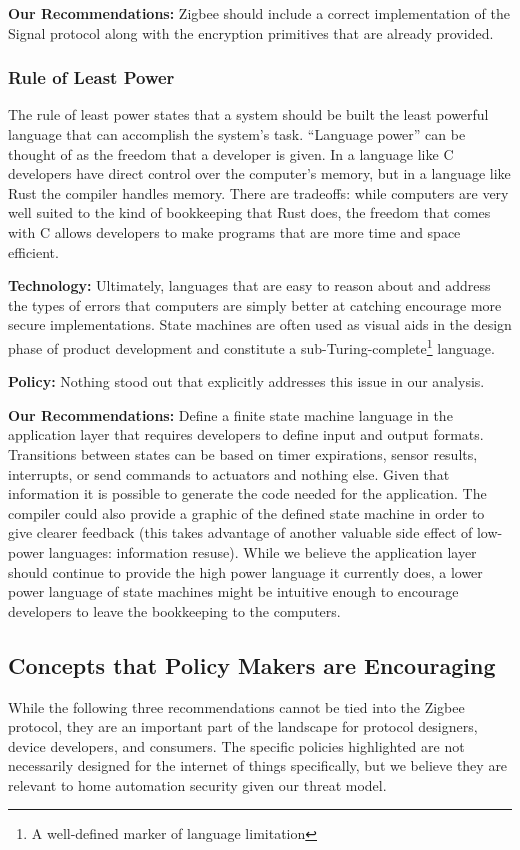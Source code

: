 {\bf Our Recommendations:} Zigbee should include a correct implementation of the Signal protocol along with the encryption primitives that are already provided.

\subsubsection{Rule of Least Power}
The rule of least power states that a system should be built the least powerful language that can accomplish the system’s task. “Language power” can be thought of as the freedom that a developer is given. In a language like C developers have direct control over the computer’s memory, but in a language like Rust the compiler handles memory. There are tradeoffs: while computers are very well suited to the kind of bookkeeping that Rust does, the freedom that comes with C allows developers to make programs that are more time and space efficient.


{\bf Technology:} Ultimately, languages that are easy to reason about and address the types of errors that computers are simply better at catching encourage more secure implementations. State machines are often used as visual aids in the design phase of product development and constitute a sub-Turing-complete\footnote{A well-defined marker of language limitation} language.

{\bf Policy:} Nothing stood out that explicitly addresses this issue in our analysis.


{\bf Our Recommendations:} Define a finite state machine language in the application layer that requires developers to define input and output formats. Transitions between states can be based on timer expirations, sensor results, interrupts, or send commands to actuators and nothing else. Given that information it is possible to generate the code needed for the application. The compiler could also provide a graphic of the defined state machine in order to give clearer feedback (this takes advantage of another valuable side effect of low-power languages: information resuse). While we believe the application layer should continue to provide the high power language it currently does, a lower power language of state machines might be intuitive enough to encourage developers to leave the bookkeeping to the computers.


\subsection{Concepts that Policy Makers are Encouraging}
While the following three recommendations cannot be tied into the Zigbee protocol, they are an important part of the landscape for protocol designers, device developers, and consumers. The specific policies highlighted are not necessarily designed for the internet of things specifically, but we believe they are relevant to home automation security given our threat model.

